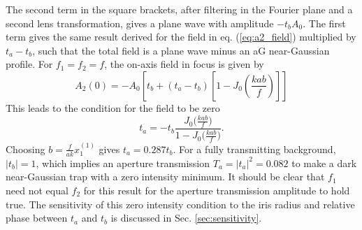 The second term in the square brackets, after filtering in the Fourier plane and a second lens transformation, gives a plane wave with amplitude $-t_{b} A_{0}$. The first term gives the same result derived for the field in eq. (\ref{eq:a2_field}) multiplied by $t_{a}-t_{b}$, such that the total field is a plane wave minus an aG near-Gaussian profile. For $f_{1}=f_{2}=f$, the on-axis field in focus is given by
\begin{equation}\label{eq:darkcenter}
    A_{2}(0)=-A_{0}\left[t_{b}+\left(t_{a}-t_{b}\right)\left[1-J_{0}\left(\frac{k a b}{f}\right)\right]\right]
\end{equation}
This leads to the condition for the field to be zero
\begin{equation}\label{eq:darkcondition}
    t_{a}=-t_{b} \frac{J_{0}\big(\frac{k a b}{f}\big)}{1-J_{0}\big(\frac{k a b}{f}\big)}.
\end{equation}
Choosing $b=\frac{f}{a k} x_1^{(1)}$ gives $t_a=0.287t_b$.
For a fully transmitting background, $\left| t_b \right|=1$, which implies an aperture transmission $T_a = \left| t_a \right| ^2=0.082$ to make a dark near-Gaussian trap with a zero intensity minimum. It should be clear that $f_1$ need not equal $f_2$ for this result for the aperture transmission amplitude to hold true. The sensitivity of this zero intensity condition to the iris radius and relative phase between $t_a$ and $t_b$ is discussed in Sec. \ref{sec:sensitivity}. 

